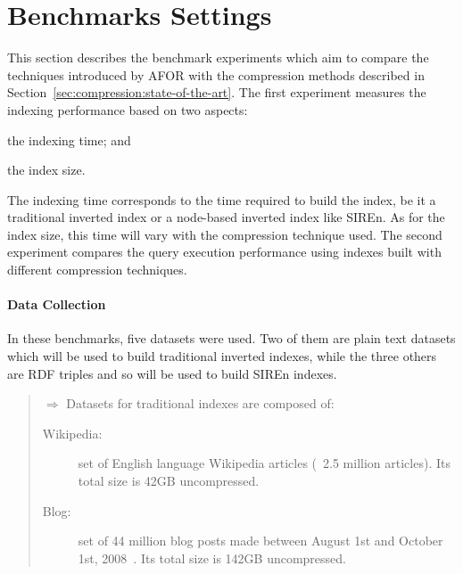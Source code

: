 \section{Benchmarks Settings}
\label{sec:benchmark:framework-cmp}

This section describes the benchmark experiments which aim to compare the
techniques introduced by AFOR with the compression methods described in
Section~\ref{sec:compression:state-of-the-art}. The first experiment measures
the indexing performance based on two aspects:
\begin{inparaenum}[(1)]
\item the indexing time; and 
\item the index size. 
\end{inparaenum}
The indexing time corresponds to the time required to build the index, be it a
traditional inverted index or a node-based inverted index like SIREn. As for
the index size, this time will vary with the compression technique used. The
second experiment compares the query execution performance using indexes built
with different compression techniques.

\paragraph{Data Collection}

In these benchmarks, five datasets were used. Two of them are plain text
datasets which will be used to build traditional inverted indexes, while the
three others are RDF triples and so will be used to build SIREn indexes.

\begin{quotation}
$\Longrightarrow$ Datasets for traditional indexes are composed of:
\begin{description}
\item[Wikipedia:] set of English language Wikipedia articles (~2.5 million
articles). Its total size is 42GB uncompressed.
\item[Blog:] set of 44 million blog posts made between August 1st and October
1st, 2008~\cite{burton:2009:spinn3r}. Its total size is 142GB uncompressed.
\end{description}
\end{quotation}

